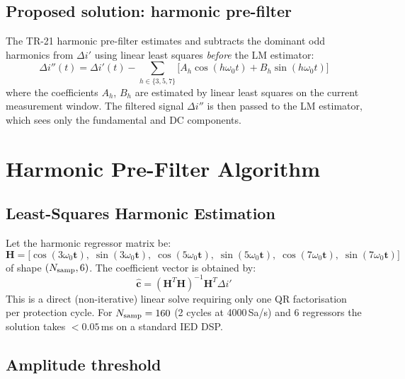 \documentclass[11pt, a4paper]{article}
\begin{document}
\subsection{Proposed solution: harmonic pre-filter}

The TR-21 harmonic pre-filter estimates and subtracts the dominant odd
harmonics from $\Delta i'$ using linear least squares \emph{before} the LM
estimator:
\begin{equation}
  \Delta i''(t) = \Delta i'(t)
    - \sum_{h \in \{3,5,7\}}
      \bigl[A_h\cos(h\omega_0 t) + B_h\sin(h\omega_0 t)\bigr]
  \label{eq:filter}
\end{equation}
where the coefficients $A_h$, $B_h$ are estimated by linear least squares on
the current measurement window.  The filtered signal $\Delta i''$ is then
passed to the LM estimator, which sees only the fundamental and DC components.


\section{Harmonic Pre-Filter Algorithm}
\label{sec:algorithm}

\subsection{Least-Squares Harmonic Estimation}

Let the harmonic regressor matrix be:
\begin{equation}
  \mathbf{H} = \bigl[\cos(3\omega_0 \mathbf{t}),\; \sin(3\omega_0 \mathbf{t}),\;
                      \cos(5\omega_0 \mathbf{t}),\; \sin(5\omega_0 \mathbf{t}),\;
                      \cos(7\omega_0 \mathbf{t}),\; \sin(7\omega_0 \mathbf{t})\bigr]
  \label{eq:H_mat}
\end{equation}
of shape $(N_{\rm samp}, 6)$.  The coefficient vector is obtained by:
\begin{equation}
  \hat{\boldsymbol{c}} = (\mathbf{H}^T\mathbf{H})^{-1}\mathbf{H}^T\Delta i'
  \label{eq:lstsq}
\end{equation}
This is a direct (non-iterative) linear solve requiring only one QR
factorisation per protection cycle.  For $N_{\rm samp} = 160$ (2 cycles at
4000\,Sa/s) and 6 regressors the solution takes $< 0.05$\,ms on a standard IED
DSP.

\subsection{Amplitude threshold}
\end{document}
